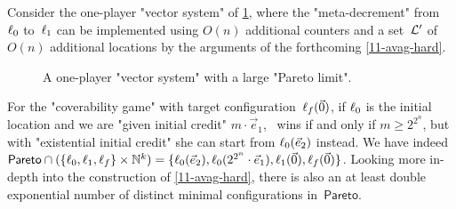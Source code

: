 \begin{example}\label{11-ex-pareto}
  Consider the one-player "vector system" of \cref{11-fig:pareto},
  where the "meta-decrement" from~$\ell_0$ to~$\ell_1$ can be
  implemented using $O(n)$ additional counters and a set~$\mathcal L'$ of
  $O(n)$ additional locations by the arguments of the
  forthcoming \cref{11-avag-hard}.
  
  \begin{figure}[htbp]
    \centering
  \caption{A one-player "vector system"
  with a large "Pareto limit".}\label{11-fig:pareto}
  \end{figure}
  For the "coverability game" with target
  configuration~$\ell_f(\vec 0)$, if $\ell_0$ is the initial location
  and we are "given initial credit" $m\cdot\vec e_1$, \Eve\ wins if and
  only if $m\geq 2^{2^n}$, but with "existential initial credit" she
  can start from $\ell_0(\vec e_2)$ instead.  We have indeed
  $\mathsf{Pareto}\cap(\{\ell_0,\ell_1,\ell_f\}\times\mathbb N^k)=\{\ell_0(\vec
  e_2),\ell_0(2^{2^n}\cdot\vec e_1),\ell_1(\vec 0),\ell_f(\vec 0)\}$.
  Looking more in-depth into the construction of \cref{11-avag-hard},
  there is also an at least double exponential number of distinct
  minimal configurations in~$\mathsf{Pareto}$.
\end{example}



